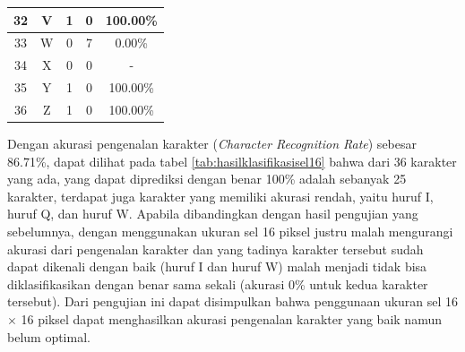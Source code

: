 \begin{longtable}[c]{|c|c|c|c|c|}
	32           & V                 & 1                       & 0                       &100.00\%            \\ \hline
	33           & W                 & 0                       & 7                       &0.00\%            \\ \hline
	34           & X                 & 0                       & 0                       & -            \\ \hline
	35           & Y                 & 1                       & 0                       &100.00\%            \\ \hline
	36           & Z                 & 1                       & 0                       &100.00\%            \\ \hline
\end{longtable}

\noindent Dengan akurasi pengenalan karakter (\textit{Character Recognition Rate}) sebesar 86.71\%, dapat dilihat pada tabel \ref{tab:hasilklasifikasisel16} bahwa dari 36  karakter yang ada, yang dapat diprediksi dengan benar 100\% adalah sebanyak 25 karakter, terdapat juga karakter yang memiliki akurasi rendah, yaitu huruf I, huruf Q, dan huruf W. Apabila dibandingkan dengan hasil pengujian yang sebelumnya, dengan menggunakan ukuran sel 16 piksel justru malah mengurangi akurasi dari pengenalan karakter dan yang tadinya karakter tersebut sudah dapat dikenali dengan baik (huruf I dan huruf W) malah menjadi tidak bisa diklasifikasikan dengan benar sama sekali (akurasi 0\% untuk kedua karakter tersebut). Dari pengujian ini dapat  disimpulkan bahwa penggunaan ukuran sel 16 $\times$ 16 piksel dapat menghasilkan akurasi pengenalan karakter yang baik namun belum optimal.\\

